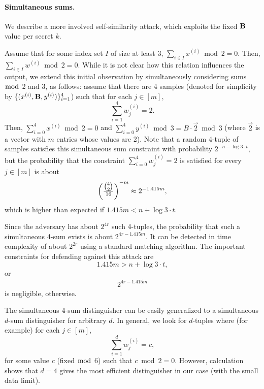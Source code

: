 \paragraph{Simultaneous sums.}

We describe a more involved self-similarity attack, which exploits the fixed $\mat{B}$ value per secret $k$.

Assume that for some index set $I$ of size at least 3, $\sum_{i \in I} x^{(i)} \bmod 2 = 0$. Then, $\sum_{i \in I} w^{(i)} \bmod 2 = 0$. While it is not clear how this relation influences the output,
we extend this initial observation by simultaneously considering sums $\bmod$ 2 and 3, as follows:
assume that there are 4 samples (denoted for simplicity
by $ \{(x^{(i)},\mat{B},y^{(i)})\}_{i=1}^{4}$) such that for each $j \in [m]$,
$$\sum_{i = 1}^{4} w^{(i)}_j = 2.$$
Then, $\sum_{i = 0}^{4} x^{(i)} \bmod 2 = 0$ and $\sum_{i = 0}^{4} y^{(i)} \bmod 3 = B \cdot \vec{2} \bmod 3$ (where $\vec{2}$ is a vector with $m$ entries whose values are 2).
Note that a random 4-tuple of samples satisfies this simultaneous sum constraint with probability
$2^{-n - \log 3 \cdot t}$, but the probability that the constraint $\sum_{i = 0}^{4} w^{(i)}_j = 2$ is satisfied for every $j \in [m]$ is about
$$\left( \tfrac{\tbinom{4}{2}}{16} \right) ^{-m} \approx 2^{- 1.415 m},$$
which is higher than expected if $1.415 m < n + \log 3 \cdot t $.

Since the adversary has about $2^{4r}$ such 4-tuples, the probability that such a simultaneous 4-sum exists is about $2^{4r - 1.415 m}$. It can be detected in time complexity of about $2^{2r}$ using a standard matching algorithm. The important constraints for defending against this attack are
$$1.415 m > n + \log 3 \cdot t,$$ or
\begin{align}
\label{eq:sim}
2^{4r - 1.415 m}
\end{align}
is negligible, otherwise.

The simultaneous 4-sum distinguisher can be easily generalized to a
simultaneous $d$-sum distinguisher for arbitrary $d$.
In general, we look for $d$-tuples where (for example)
for each $j \in [m]$, $$\sum_{i = 1}^{d} w^{(i)}_j = c,$$
for some value $c$ (fixed $\bmod$ 6) such that $c \bmod 2 = 0$.
However, calculation shows that $d = 4$ gives the most efficient
distinguisher in our case (with the small data limit).





